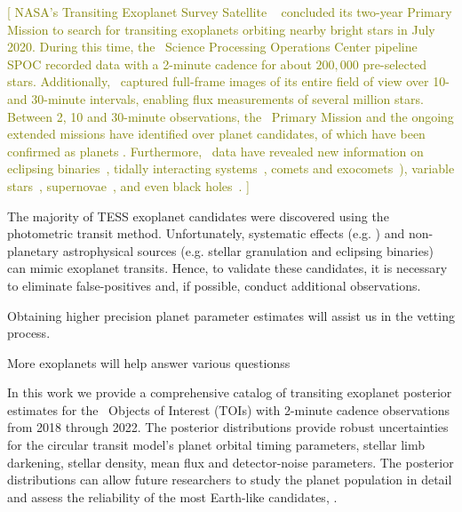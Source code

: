 \documentclass[floatfix,ApJL,twocolumn]{aastex631}
\begin{document}
\textcolor{olive}{[
NASA's Transiting Exoplanet Survey Satellite \tess\ \citep{Ricker:2015:JATIS} concluded its two-year Primary Mission to search for transiting exoplanets orbiting nearby bright stars in July 2020.
During this time, the \tess\ Science Processing Operations Center pipeline SPOC \citep{Jenkins:2016:SPIE}  recorded data with a 2-minute cadence for about $200,000$ pre-selected stars.
Additionally, \tess\ captured full-frame images of its entire field of view over 10- and 30-minute intervals, enabling flux measurements of several million stars.
Between 2, 10 and 30-minute observations, the \tess\ Primary Mission and the ongoing extended missions have identified over \red{$\numTessCandidates$} planet candidates, \red{$\numTessPlanets$} of which have been confirmed as planets \citep{Stassun:2018:AJ, Stassun:2019:AJ, Guerrero:2021:ApJS, Guerrero:2021:AAS}. Furthermore, \tess\ data have revealed new information on eclipsing binaries~\citep{ Guo:2020:MNRAS, Powell:2021:AJ}, tidally interacting systems~\citet{Holoien:2019:ApJ}, comets and exocomets~\citep{Farnham:2019:ApJL, Zieba:2019:A&A, Kuznyetsova:2020:OAP, Woods:2021:PASP, Pavlenko:2021:KPCB}),  variable stars~\citet{Antoci:2019:MNRAS, Handler:2020:NatAs}, supernovae~\cite{Vallely:2021:MNRAS, Fausnaugh:2021:ApJ}, and even black holes~\cite{Jayasinghe:2021:MNRAS}.
]}


The majority of TESS exoplanet candidates were discovered using the photometric transit method.
Unfortunately, systematic effects (e.g. ) and non-planetary astrophysical sources (e.g. stellar granulation and eclipsing binaries) can mimic exoplanet transits.
Hence, to validate these candidates, it is necessary to eliminate false-positives and, if possible, conduct additional observations.

Obtaining higher precision planet parameter estimates will assist us in the vetting process.

More exoplanets will help answer various questionss





In this work we provide a comprehensive catalog of transiting exoplanet posterior estimates for the \red{\numAnalysed} \tess\ Objects of Interest (TOIs) with 2-minute cadence observations from 2018 through 2022.
The posterior distributions provide robust uncertainties for the circular transit model's planet orbital timing parameters, stellar limb darkening, stellar density, mean flux and detector-noise parameters.
The posterior distributions can allow future researchers to study the planet population in detail and assess the reliability of the most Earth-like candidates, .
\end{document}

